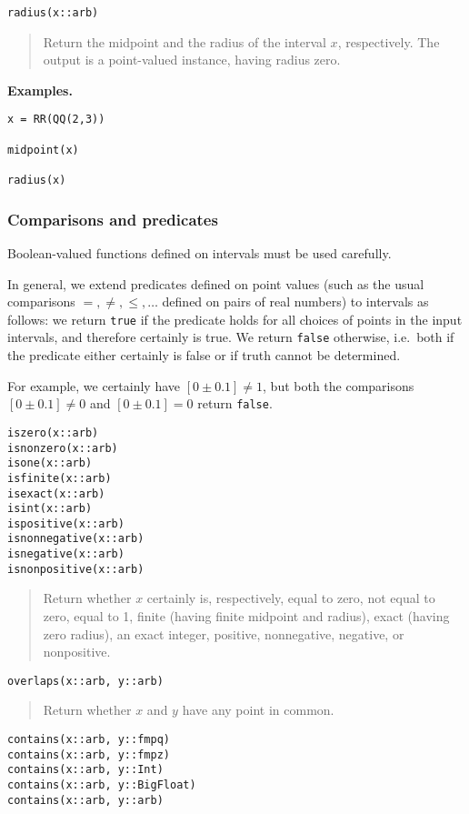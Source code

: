 \documentclass[a4paper,10pt]{article}
\newcommand{\desc}[1]{\vspace{-3mm}\begin{quote}#1\end{quote}}
\begin{document}
{{\begin{lstlisting}
radius(x::arb)
\end{lstlisting}

\desc{Return the midpoint and the radius of the interval $x$, respectively.
The output is a point-valued \text{arb} instance, having radius zero.}

\textbf{Examples.}

\begin{lstlisting}
x = RR(QQ(2,3))

midpoint(x)

radius(x)
\end{lstlisting}

\subsubsection{Comparisons and predicates}

Boolean-valued functions defined on intervals must be used carefully.

In general, we extend predicates defined on point values (such as
the usual comparisons $=, \ne, \le, \ldots$ defined on pairs of real numbers)
to intervals as follows: we return
\texttt{true} if the predicate holds for all choices of points
in the input intervals, and therefore certainly is true.
We return \texttt{false} otherwise, i.e.\ both if the predicate
either certainly is false or if truth cannot be determined.

For example, we certainly have $[0 \pm 0.1] \ne 1$, but both the
comparisons $[0 \pm 0.1] \ne 0$ and $[0 \pm 0.1] = 0$
return \texttt{false}.

\begin{lstlisting}
iszero(x::arb)
isnonzero(x::arb)
isone(x::arb)
isfinite(x::arb)
isexact(x::arb)
isint(x::arb)
ispositive(x::arb)
isnonnegative(x::arb)
isnegative(x::arb)
isnonpositive(x::arb)
\end{lstlisting}

\desc{Return whether $x$ certainly is, respectively, equal to zero,
not equal to zero, equal to 1, finite (having finite midpoint and radius),
exact (having zero radius), an exact integer, positive, nonnegative,
negative, or nonpositive.}

\begin{lstlisting}
overlaps(x::arb, y::arb)
\end{lstlisting}

\desc{Return whether $x$ and $y$ have any point in common.}

\begin{lstlisting}
contains(x::arb, y::fmpq)
contains(x::arb, y::fmpz)
contains(x::arb, y::Int)
contains(x::arb, y::BigFloat)
contains(x::arb, y::arb)
\end{lstlisting}

}}
\end{document}
